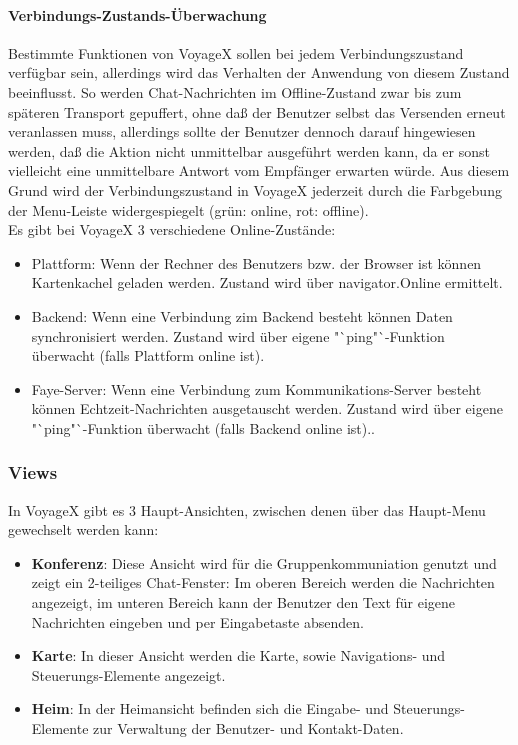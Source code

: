 \paragraph{Verbindungs-Zustands-Überwachung}
Bestimmte Funktionen von VoyageX sollen bei jedem Verbindungszustand verfügbar sein, allerdings
wird das Verhalten der Anwendung von diesem Zustand beeinflusst. So werden Chat-Nachrichten im Offline-Zustand zwar bis zum
späteren Transport gepuffert, ohne daß der Benutzer selbst das Versenden erneut veranlassen muss, allerdings sollte der Benutzer dennoch darauf hingewiesen werden, daß die Aktion nicht unmittelbar ausgeführt werden kann, da er sonst vielleicht eine unmittelbare Antwort vom Empfänger erwarten würde. Aus diesem Grund wird der Verbindungszustand in VoyageX jederzeit durch die Farbgebung der Menu-Leiste widergespiegelt (grün: online, rot: offline).\\%
Es gibt bei VoyageX 3 verschiedene Online-Zustände:
	\begin{itemize}
		\item Plattform: Wenn der Rechner des Benutzers bzw. der Browser ist können Kartenkachel geladen werden. Zustand wird über navigator.Online ermittelt.
		\item Backend: Wenn eine Verbindung zim Backend besteht können Daten synchronisiert werden. Zustand wird über eigene "`ping"`-Funktion  überwacht (falls Plattform online ist).
		\item Faye-Server: Wenn eine Verbindung zum Kommunikations-Server besteht können Echtzeit-Nachrichten ausgetauscht werden. Zustand wird über eigene "`ping"`-Funktion  überwacht (falls Backend online ist)..
	\end{itemize}


\subsubsection{Views}
In VoyageX gibt es 3 Haupt-Ansichten, zwischen denen über das Haupt-Menu gewechselt werden kann:
\begin{itemize}[leftmargin=*,noitemsep,topsep=1ex,parsep=0pt,partopsep=0pt]
\item \textbf{Konferenz}: Diese Ansicht wird für die Gruppenkommuniation genutzt und zeigt ein 2-teiliges Chat-Fenster: Im oberen Bereich werden die Nachrichten angezeigt, im unteren Bereich kann der Benutzer den Text für eigene Nachrichten eingeben und per Eingabetaste absenden. 
\item \textbf{Karte}: In dieser Ansicht werden die Karte, sowie Navigations- und Steuerungs-Elemente angezeigt.
\item \textbf{Heim}: In der Heimansicht befinden sich die Eingabe- und Steuerungs-Elemente zur Verwaltung der Benutzer- und Kontakt-Daten.
\end{itemize}
	
